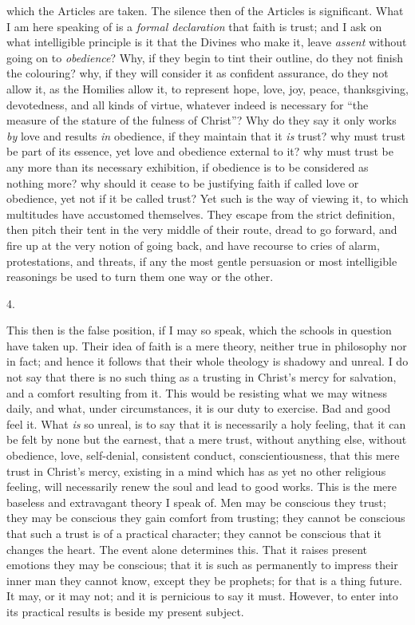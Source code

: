 which the Articles are taken. The silence then of the Articles
is significant. What I am here speaking of is a \emph{formal declaration}
that faith is trust; and I ask on what intelligible principle is it
that the Divines who make it, leave \emph{assent} without going on to \emph{obedience}?
Why, if they begin to tint their outline, do they not finish the
colouring? why, if they will consider it as confident assurance, do
they not allow it, as the Homilies allow it, to represent hope, love,
joy, peace, thanksgiving, devotedness, and all kinds of virtue,
whatever indeed is necessary for ``the measure of the stature of
the fulness of Christ''? Why do they say it only works \emph{by}
love and results \emph{in} obedience, if they maintain that it \emph{is}
trust? why must trust be part of its essence, yet love and obedience
external to it? why must trust be any more than its necessary
exhibition, if obedience is to be considered as nothing more? why
should it cease to be justifying faith if called love or obedience,
yet not if it be called trust? Yet such is the way of viewing it, to
which multitudes have accustomed themselves. They escape from the
strict definition, then pitch their tent in the very middle of
their route, dread to go forward, and fire up at the very notion of
going back, and have recourse to cries of alarm, protestations, and
threats, if any the most gentle persuasion or most intelligible
reasonings be used to turn them one way or the other.

4.

This then is the false position, if I may so speak, which the
schools in question have taken up. Their idea of faith is a mere
theory, neither true in philosophy nor in fact; and hence it follows
that their whole theology is shadowy and unreal. I do not say that
there is no such thing as a trusting in Christ's mercy for salvation,
and a comfort resulting from it. This would be resisting what we may
witness daily, and what, under circumstances, it is our duty to
exercise. Bad and good feel it. What \emph{is} so unreal, is to say
that it is necessarily a holy feeling, that it can be felt by none but
the earnest, that a mere trust, without anything else, without
obedience, love, self-denial, consistent conduct, conscientiousness,
that this mere trust in Christ's mercy, existing in a mind which has
as yet no other religious feeling, will necessarily renew the soul and
lead to good works. This is the mere baseless and extravagant theory I
speak of. Men may be conscious they trust; they may be conscious they
gain comfort from trusting; they cannot be conscious that such a trust
is of a practical character; they cannot be conscious that it changes
the heart. The event alone determines this. That it raises present
emotions they may be conscious; that it is such as permanently to
impress their inner man they cannot know, except they be
prophets; for that is a thing future. It may, or it may not; and it is
pernicious to say it must. However, to enter into its practical
results is beside my present subject.

